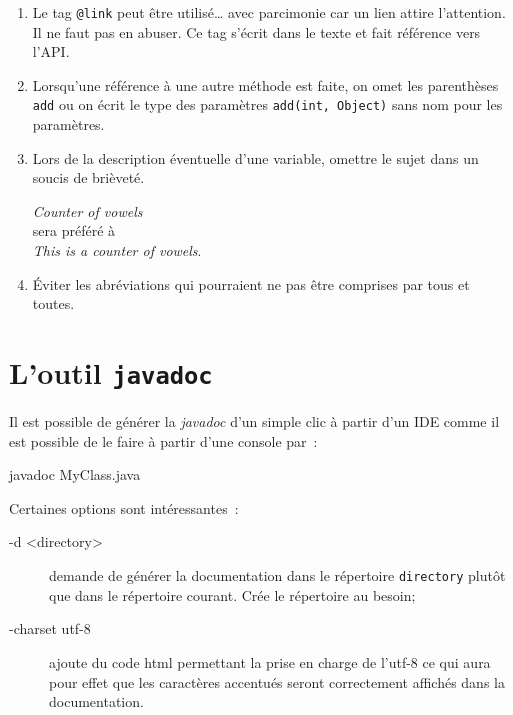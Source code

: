 \begin{enumerate}
	\item Le tag \texttt{@link} peut être utilisé… avec parcimonie car un lien
		attire l'attention. Il ne faut pas en abuser. Ce tag s'écrit dans le
		texte et fait référence vers l'API.

	\item Lorsqu'une référence à une autre méthode est faite, on omet les
		parenthèses \texttt{add} ou on écrit le type des paramètres
		\texttt{add(int, Object)} sans nom pour les paramètres. 

	\item Lors de la description éventuelle d'une variable, omettre le sujet
		dans un soucis de brièveté. 

		\medskip
		\textit{Counter of vowels}\\
		sera préféré à\\
		\textit{This is a counter of vowels}.

	\item Éviter les abréviations qui pourraient ne pas être comprises par tous
		et toutes. 

\end{enumerate}







\section{L'outil \texttt{javadoc}}

Il est possible de générer la \textit{javadoc} d'un simple clic à partir d'un IDE comme il est possible de le faire à partir d'une console par~:

\begin{term}
	javadoc MyClass.java
\end{term}

Certaines options sont intéressantes~:

\begin{description}

	\item[-d <directory>] demande de générer la documentation dans le
		répertoire \texttt{directory} plutôt que dans le répertoire courant.
		Crée le répertoire au besoin;

	\item[-charset utf-8] ajoute du code html permettant la prise en charge de
		l'utf-8 ce qui aura pour effet que les caractères accentués seront
		correctement affichés dans la documentation. 

\end{description}

